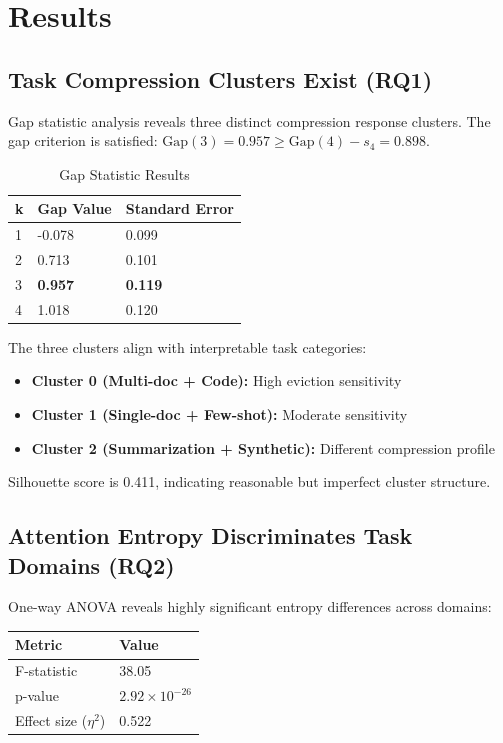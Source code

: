 \section{Results}

\subsection{Task Compression Clusters Exist (RQ1)}

Gap statistic analysis reveals three distinct compression response clusters. The gap criterion is satisfied: $\text{Gap}(3) = 0.957 \geq \text{Gap}(4) - s_4 = 0.898$.

\begin{table}[h]
\centering
\caption{Gap Statistic Results}
\begin{tabular}{@{}lll@{}}
\toprule
k & Gap Value & Standard Error \\
\midrule
1 & -0.078 & 0.099 \\
2 & 0.713 & 0.101 \\
3 & \textbf{0.957} & \textbf{0.119} \\
4 & 1.018 & 0.120 \\
\bottomrule
\end{tabular}
\end{table}

The three clusters align with interpretable task categories:
\begin{itemize}
    \item \textbf{Cluster 0 (Multi-doc + Code):} High eviction sensitivity
    \item \textbf{Cluster 1 (Single-doc + Few-shot):} Moderate sensitivity
    \item \textbf{Cluster 2 (Summarization + Synthetic):} Different compression profile
\end{itemize}

Silhouette score is 0.411, indicating reasonable but imperfect cluster structure.

\subsection{Attention Entropy Discriminates Task Domains (RQ2)}

One-way ANOVA reveals highly significant entropy differences across domains:

\begin{table}[h]
\centering
\begin{tabular}{@{}ll@{}}
\toprule
Metric & Value \\
\midrule
F-statistic & 38.05 \\
p-value & $2.92 \times 10^{-26}$ \\
Effect size ($\eta^2$) & 0.522 \\
\bottomrule
\end{tabular}
\end{table}

